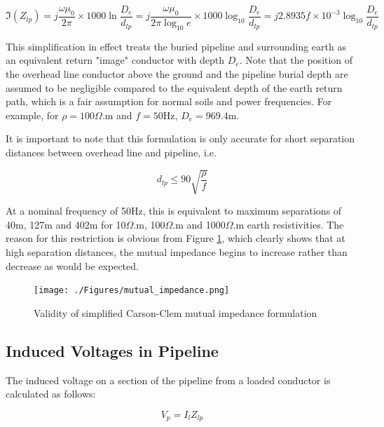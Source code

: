 \documentclass{article}
\begin{document}
\begin{equation}
\Im (Z_{lp}) = j \frac{\omega \mu_0}{2 \pi} \times 1000 \ln \frac{D_{e}}{d_{lp}} = j \frac{\omega \mu_0}{2 \pi \log_{10}{e}} \times 1000 \log_{10} \frac{D_{e}}{d_{lp}} = j 2.8935 f \times 10^{-3} \log_{10}{\frac{D_{e}}{d_{lp}}} 
\end{equation}

This simplification in effect treats the buried pipeline and surrounding earth as an equivalent return "image" conductor with depth $D_{e}$. Note that the position of the overhead line conductor above the ground and the pipeline burial depth are assumed to be negligible compared to the equivalent depth of the earth return path, which is a fair assumption for normal soils and power frequencies. For example, for $\rho = 100 \Omega$.m and $f = 50$Hz, $D_e = 969.4$m. 

It is important to note that this formulation is only accurate for short separation distances between overhead line and pipeline, i.e.

\begin{equation}
d_{lp} \leq 90 \sqrt{\frac{\rho}{f}}
\end{equation}

At a nominal frequency of 50Hz, this is equivalent to maximum separations of 40m, 127m and 402m for 10$\Omega$.m, 100$\Omega$.m and 1000$\Omega$.m earth resistivities. The reason for this restriction is obvious from Figure \ref{fig:mutual_impedance}, which clearly shows that at high separation distances, the mutual impedance begins to increase rather than decrease as would be expected.

\begin{figure}
\begin{center}
\caption{Validity of simplified Carson-Clem mutual impedance formulation}
\label{fig:mutual_impedance}
\texttt{[image: ./Figures/mutual\_impedance.png]}
\end{center}
\end{figure}

\subsection{Induced Voltages in Pipeline}
The induced voltage on a section of the pipeline from a loaded conductor is calculated as follows:

\begin{equation}
V_{p} = I_{l} Z_{lp}
\end{equation}
\end{document}
